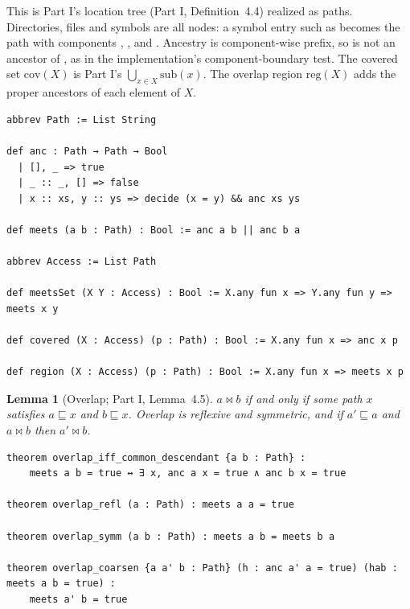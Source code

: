 \documentclass[11pt,letterpaper]{article}
\newtheorem{lemma}[theorem]{Lemma}
\theoremstyle{definition}
\theoremstyle{remark}
\newcommand{\meets}{\bowtie}
\newcommand{\cov}{\sqsubseteq}
\newcommand{\op}[1]{\mathrm{#1}}
\newcommand{\covd}{\op{cov}}
\newcommand{\reg}{\op{reg}}
\begin{document}
This is Part I's location tree (Part I, Definition~4.4) realized as paths. Directories, files and symbols are all nodes: a symbol entry such as  becomes the path with components , ,  and . Ancestry is component-wise prefix, so  is not an ancestor of , as in the implementation's component-boundary test. The covered set $\covd(X)$ is Part I's $\bigcup_{x\in X}\mathrm{sub}(x)$. The overlap region $\reg(X)$ adds the proper ancestors of each element of $X$.

\begin{lstlisting}[language=Lean,caption={Paths, ancestry, overlap, coverage and region (\texttt{YonedaTx/Paths.lean})},label={lst:mcbl:paths}]
abbrev Path := List String

def anc : Path → Path → Bool
  | [], _ => true
  | _ :: _, [] => false
  | x :: xs, y :: ys => decide (x = y) && anc xs ys

def meets (a b : Path) : Bool := anc a b || anc b a

abbrev Access := List Path

def meetsSet (X Y : Access) : Bool := X.any fun x => Y.any fun y => meets x y

def covered (X : Access) (p : Path) : Bool := X.any fun x => anc x p

def region (X : Access) (p : Path) : Bool := X.any fun x => meets x p
\end{lstlisting}

\begin{lemma}[Overlap; Part I, Lemma~4.5]
\label{lem:mcbl:overlap}
$a\meets b$ if and only if some path $x$ satisfies $a\cov x$ and $b\cov x$. Overlap is reflexive and symmetric, and if $a'\cov a$ and $a\meets b$ then $a'\meets b$.
\end{lemma}

\begin{lstlisting}[language=Lean,caption={The overlap lemma (\texttt{YonedaTx/Paths.lean})},label={lst:mcbl:overlap}]
theorem overlap_iff_common_descendant {a b : Path} :
    meets a b = true ↔ ∃ x, anc a x = true ∧ anc b x = true

theorem overlap_refl (a : Path) : meets a a = true

theorem overlap_symm (a b : Path) : meets a b = meets b a

theorem overlap_coarsen {a a' b : Path} (h : anc a' a = true) (hab : meets a b = true) :
    meets a' b = true
\end{lstlisting}
\end{document}
